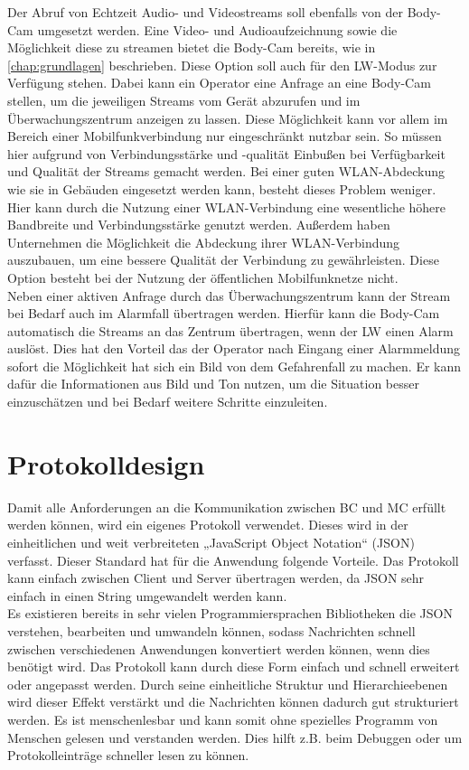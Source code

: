 \documentclass[thesis.tex]{subfiles}
\begin{document}
Der Abruf von Echtzeit Audio- und Videostreams soll ebenfalls von der Body-Cam umgesetzt werden.
Eine Video- und Audioaufzeichnung sowie die Möglichkeit diese zu streamen bietet die Body-Cam bereits, wie in \autoref{chap:grundlagen} beschrieben.
Diese Option soll auch für den LW-Modus zur Verfügung stehen.
Dabei kann ein Operator eine Anfrage an eine Body-Cam stellen, um die jeweiligen Streams vom Gerät abzurufen und im Überwachungszentrum anzeigen zu lassen.
Diese Möglichkeit kann vor allem im Bereich einer Mobilfunkverbindung nur eingeschränkt nutzbar sein.
So müssen hier aufgrund von Verbindungsstärke und -qualität Einbußen bei Verfügbarkeit und Qualität der Streams gemacht werden.
Bei einer guten WLAN-Abdeckung wie sie in Gebäuden eingesetzt werden kann, besteht dieses Problem weniger.
Hier kann durch die Nutzung einer WLAN-Verbindung eine wesentliche höhere Bandbreite und Verbindungsstärke genutzt werden.
Außerdem haben Unternehmen die Möglichkeit die Abdeckung ihrer WLAN-Verbindung auszubauen, um eine bessere Qualität der Verbindung zu gewährleisten.
Diese Option besteht bei der Nutzung der öffentlichen Mobilfunknetze nicht.
\\

Neben einer aktiven Anfrage durch das Überwachungszentrum kann der Stream bei Bedarf auch im Alarmfall übertragen werden.
Hierfür kann die Body-Cam automatisch die Streams an das Zentrum übertragen, wenn der LW einen Alarm auslöst.
Dies hat den Vorteil das der Operator nach Eingang einer Alarmmeldung sofort die Möglichkeit hat sich ein Bild von dem Gefahrenfall zu machen.
Er kann dafür die Informationen aus Bild und Ton nutzen, um die Situation besser einzuschätzen und bei Bedarf weitere Schritte einzuleiten.


\section{Protokolldesign}
Damit alle Anforderungen an die Kommunikation zwischen BC und MC erfüllt werden können, wird ein eigenes Protokoll verwendet.
Dieses wird in der einheitlichen und weit verbreiteten „JavaScript Object Notation“ (JSON) verfasst.
Dieser Standard hat für die Anwendung folgende Vorteile.
Das Protokoll kann einfach zwischen Client und Server übertragen werden, da JSON sehr einfach in einen String umgewandelt werden kann.
\\

Es existieren bereits in sehr vielen Programmiersprachen Bibliotheken die JSON verstehen, bearbeiten und umwandeln können,
sodass Nachrichten schnell zwischen verschiedenen Anwendungen konvertiert werden können, wenn dies benötigt wird.
Das Protokoll kann durch diese Form einfach und schnell erweitert oder angepasst werden.
Durch seine einheitliche Struktur und Hierarchieebenen wird dieser Effekt verstärkt und die Nachrichten können dadurch gut strukturiert werden.
Es ist menschenlesbar und kann somit ohne spezielles Programm von Menschen gelesen und verstanden werden.
Dies hilft z.B. beim Debuggen oder um Protokolleinträge schneller lesen zu können.
\\
\end{document}
